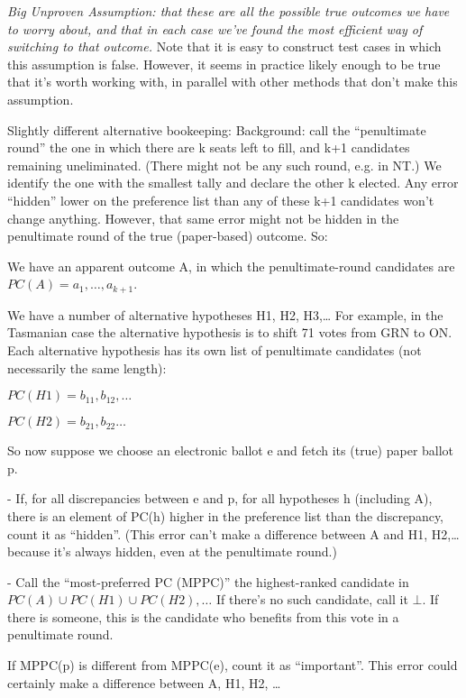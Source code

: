 \documentclass[10pt,a4paper]{article}
\begin{document}
\emph{Big Unproven Assumption: that these are all the possible true outcomes we have to worry about, and that in each case we've found the most efficient way of switching to that outcome.}  Note that it is easy to construct test cases in which this assumption is false.  However, it seems in practice likely enough to be true that it's worth working with, in parallel with other methods that don't make this assumption.

Slightly different alternative bookeeping: Background: call the “penultimate round” the one in which there are k seats left to fill, and k+1 candidates remaining uneliminated.  (There might not be any such round, e.g. in NT.)  We identify the one with the smallest tally and declare the other k elected.  Any error “hidden” lower on the preference list than any of these k+1 candidates won’t change anything.  However, that same error might not be hidden in the penultimate round of the true (paper-based) outcome.  So:

 

We have an apparent outcome A, in which the penultimate-round candidates are $PC(A) = a_1, \ldots, a_{k+1}$.

We have a number of alternative hypotheses H1, H2, H3,…  For example, in the Tasmanian case the alternative hypothesis is to shift 71 votes from GRN to ON.  Each alternative hypothesis has its own list of penultimate candidates (not necessarily the same length):

$PC(H1) = b_{11}, b_{12}, \ldots $


$PC(H2) = b_{21}, b_{22}\ldots $

 

So now suppose we choose an electronic ballot e and fetch its (true) paper ballot p.



- If, for all discrepancies between e and p, for all hypotheses h (including A), there is an element of PC(h) higher in the preference list than the discrepancy, count it as “hidden”.  (This error can’t make a difference between A and H1, H2,… because it’s always hidden, even at the penultimate round.)

- Call the “most-preferred PC (MPPC)” the highest-ranked candidate in $ PC(A) \cup PC(H1) \cup PC(H2),\ldots$ If there’s no such candidate, call it $\bot$.  If there is someone, this is the candidate who benefits from this vote in a penultimate round.

If MPPC(p) is different from MPPC(e), count it as “important”.  This error could certainly make a difference between A, H1, H2, …
\end{document}
